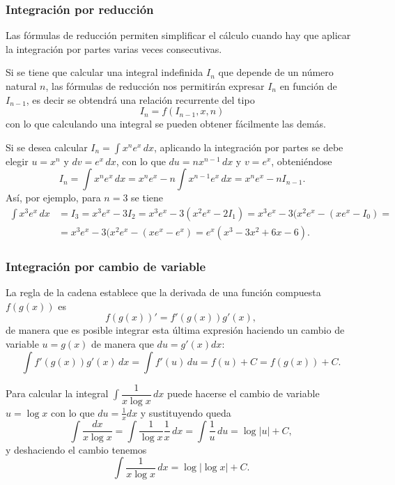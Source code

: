 \begin{frame}
	\frametitle{Integración por reducción}
	Las fórmulas de reducción permiten simplificar el cálculo cuando hay que aplicar la integración por partes varias veces consecutivas.
	
	Si se tiene que calcular una integral indefinida $I_{n}$ que depende de un número natural $n$, las fórmulas de reducción nos permitirán expresar $I_{n}$ en función de $I_{n-1}$, es decir se obtendrá una relación recurrente del tipo
	\[
		\ I_{n}=f(I_{n-1},x,n)
	\]
	con lo que calculando una integral se pueden obtener fácilmente las demás.
	
	 Si se desea calcular $I_{n}=\int{x^{n}e^{x}}\,dx$, aplicando la integración por partes se debe elegir $u=x^{n}$ y $dv=e^{x}\,dx$, con lo que $du=nx^{n-1}\,dx$ y $v=e^{x}$, obteniéndose
	\[
		\ I_{n}=\int{x^{n}e^{x}}\,dx=x^{n}e^{x}-n\int{x^{n-1}e^{x}}\,dx=x^{n}e^{x}-nI_{n-1}.
	\]
	Así, por ejemplo, para $n=3$ se tiene
	\begin{align*}
		\int x^3 e^x\, dx & = I_3 = x^3e^x-3I_2 = x^3e^x-3(x^2e^x-2I_1) = x^3e^x-3(x^2e^x-(xe^x-I_0) = \\
		                  & = x^3e^x-3(x^2e^x-(xe^x-e^x) = e^x(x^3-3x^2+6x-6).                         
	\end{align*}
\end{frame}


\begin{frame}
	\frametitle{Integración por cambio de variable}
	La regla de la cadena establece que la derivada de una función compuesta $f(g(x))$ es
	\[
		f(g(x))' = f'(g(x))g'(x),
	\]
	de manera que es posible integrar esta última expresión haciendo un cambio de variable $u=g(x)$ de manera que
	$du=g'(x)dx$:
	\[
		\int f'(g(x))g'(x)\, dx = \int f'(u)\, du = f(u)+C = f(g(x))+C.
	\]
	
	 Para calcular la integral $\int{\dfrac{1}{x\log x}}\, dx$
	puede hacerse el cambio de variable $u=\log x$ con lo que $du=\frac{1}{x}dx$ y sustituyendo queda
	\[
		\int \frac{dx}{x\log x}=\int \frac{1}{\log x}\frac{1}{x}\,dx = \int \frac{1}{u}\,du = \log |u|+ C,
	\]
	y deshaciendo el cambio tenemos
	\[
		\int \frac{1}{x\log x}\,dx= \log |\log x| + C.
	\]
\end{frame}



